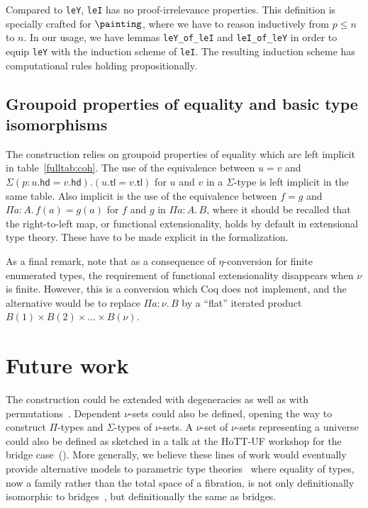 \documentclass{msc}
\newcommand{\tl}{\ensuremath{\mathsf{tl}}}
\newcommand{\hd}{\ensuremath{\mathsf{hd}}}
\begin{document}
Compared to \texttt{leY}, \texttt{leI} has no proof-irrelevance properties. This definition is specially crafted for $\painting$, where we have to reason inductively from $p \leq n$ to $n$. In our usage, we have lemmas \texttt{leY\_of\_leI} and \texttt{leI\_of\_leY} in order to equip \texttt{leY} with the induction scheme of \texttt{leI}. The resulting induction scheme has computational rules holding propositionally.

\subsection{Groupoid properties of equality and basic type isomorphisms\label{sec:eqproperties}}
The construction relies on groupoid properties of equality which are left implicit in table~\ref{fulltab:coh}. The use of the equivalence between $u = v$ and $\Sigma (p:u.\hd = v.\hd). (u.\tl = v.\tl)$ for $u$ and $v$ in a $\Sigma$-type is left implicit in the same table. Also implicit is the use of the equivalence between $f = g$ and $\Pi a: A.\, f(a) = g(a)$ for $f$ and $g$ in $\Pi a: A.\, B$, where it should be recalled that the right-to-left map, or functional extensionality, holds by default in extensional type theory. These have to be made explicit in the formalization.

As a final remark, note that as a consequence of $\eta$-conversion for finite enumerated types, the requirement of functional extensionality disappears when $\nu$ is finite. However, this is a conversion which Coq does not implement, and the alternative would be to replace $\Pi a: \nu.\, B$ by a ``flat'' iterated product $B(1) \times B(2) \times \ldots \times B(\nu)$.

\section{Future work}
The construction could be extended with degeneracies as well as with permutations~\citep{grandis03}. Dependent $\nu$-sets could also be defined, opening the way to construct $\Pi$-types and $\Sigma$-types of $\nu$-sets. A $\nu$-set of $\nu$-sets representing a universe could also be defined as sketched in a talk at the HoTT-UF workshop for the bridge case~(\citeyear{herbelin-hott-uf}). More generally, we believe these lines of work would eventually provide alternative models to parametric type theories~\citep{nuyts17,cavallo19} where equality of types, now a family rather than the total space of a fibration, is not only definitionally isomorphic to bridges~\citep{bernardy15}, but definitionally the same as bridges.
\end{document}
